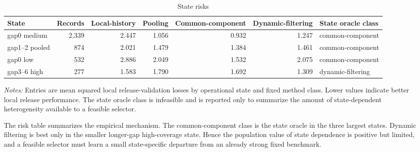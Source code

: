 \documentclass[a4paper,12pt]{article}
\newcommand{\1}{\mathbf{1}}
\newcommand{\ExhibitNote}[1]{\begin{minipage}{0.94\textwidth}\footnotesize\emph{Notes:} #1\end{minipage}}
\begin{document}
\begin{table}[H]
\centering
\caption{State risks}
\label{tab:ia_state_risks}
\small
\begin{adjustbox}{max width=\textwidth}
\begin{tabular}{@{}lrrrrrl@{}}
\toprule
State & Records & Local-history & Pooling & Common-component & Dynamic-filtering & State oracle class \\
\midrule
gap0 medium & 2,339 & 2.447 & 1.056 & 0.932 & 1.247 & common-component \\
gap1--2 pooled & 874 & 2.021 & 1.479 & 1.384 & 1.461 & common-component \\
gap0 low & 532 & 2.886 & 2.049 & 1.532 & 2.075 & common-component \\
gap3--6 high & 277 & 1.583 & 1.790 & 1.692 & 1.309 & dynamic-filtering \\
\bottomrule
\end{tabular}
\end{adjustbox}
\par\medskip
\ExhibitNote{Entries are mean squared local release-validation losses by operational state and fixed method class. Lower values indicate better local release performance. The state oracle class is infeasible and is reported only to summarize the amount of state-dependent heterogeneity available to a feasible selector.}
\end{table}

The risk table summarizes the empirical mechanism. The common-component class is the state oracle in the three largest states. Dynamic filtering is best only in the smaller longer-gap high-coverage state. Hence the population value of state dependence is positive but limited, and a feasible selector must learn a small state-specific departure from an already strong fixed benchmark.
\end{document}
